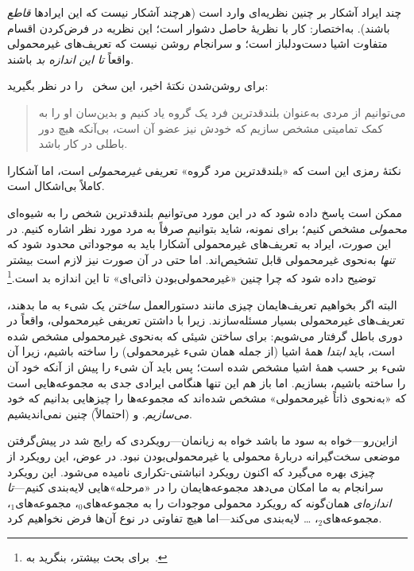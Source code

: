 \documentclass[../../../include/open-logic-section]{subfiles}
\begin{document}
چند ایراد آشکار بر چنین نظریه‌ای وارد است (هرچند آشکار نیست که این ایرادها
\emph{قاطع} باشند). به‌اختصار: کار با نظریهٔ حاصل دشوار است؛ این نظریه در
فرض‌کردن اقسام متفاوت اشیا دست‌ودلباز است؛ و سرانجام روشن نیست که
تعریف‌های غیرمحمولی واقعاً \emph{تا این اندازه بد} باشند.
	
برای روشن‌شدن نکتهٔ اخیر، این سخن~\citeauthor{Ramsey1925} را در نظر
بگیرید:
\begin{quote}
	می‌توانیم از مردی به‌عنوان بلندقدترین فرد یک گروه یاد کنیم و بدین‌سان
	او را به کمک تمامیتی مشخص سازیم که خودش نیز عضو آن است، بی‌آنکه هیچ
	دور باطلی در کار باشد. \citep{Ramsey1925}
\end{quote}
نکتهٔ رمزی این است که «بلندقدترین مرد گروه» تعریفی \emph{غیرمحمولی}
است، اما آشکارا کاملاً بی‌اشکال است.

ممکن است پاسخ داده شود که در این مورد می‌توانیم بلندقدترین شخص را به
شیوه‌ای \emph{محمولی} مشخص کنیم؛ برای نمونه، شاید بتوانیم صرفاً به مرد
مورد نظر اشاره کنیم. در این صورت، ایراد به تعریف‌های غیرمحمولی آشکارا
باید به موجوداتی محدود شود که \emph{تنها} به‌نحوی غیرمحمولی قابل تشخیص‌اند.
اما حتی در آن صورت نیز لازم است بیشتر توضیح داده شود که چرا چنین
«غیرمحمولی‌بودن ذاتی‌ای» تا این اندازه بد است.\footnote{برای بحث بیشتر،
بنگرید به~\citet{Linnebo2010}.}

البته اگر بخواهیم تعریف‌هایمان چیزی مانند دستورالعمل \emph{ساختن} یک شیء
به ما بدهند، تعریف‌های غیرمحمولی بسیار مسئله‌سازند. زیرا با داشتن تعریفی
غیرمحمولی، واقعاً در دوری باطل گرفتار می‌شویم: برای ساختن شیئی که به‌نحوی
غیرمحمولی مشخص شده است، باید \emph{ابتدا} همهٔ اشیا (از جمله همان شیء
غیرمحمولی) را ساخته باشیم، زیرا آن شیء بر حسب همهٔ اشیا مشخص شده است؛ پس
باید آن شیء را پیش از آنکه خود آن را ساخته باشیم، بسازیم. اما باز هم این
تنها هنگامی ایرادی جدی به مجموعه‌هایی است که «به‌نحوی ذاتاً غیرمحمولی»
مشخص شده‌اند که مجموعه‌ها را چیزهایی بدانیم که خود \emph{می‌سازیم}. و
(احتمالاً) چنین نمی‌اندیشیم.

ازاین‌رو---خواه به سود ما باشد خواه به زیانمان---رویکردی که رایج شد در
پیش‌گرفتن موضعی سخت‌گیرانه دربارهٔ محمولی یا غیرمحمولی‌بودن نبود. در عوض،
این رویکرد از چیزی بهره می‌گیرد که اکنون رویکرد انباشتی-تکراری نامیده
می‌شود. این رویکرد سرانجام به ما امکان می‌دهد مجموعه‌هایمان را در
«مرحله»هایی لایه‌بندی کنیم---\emph{تا اندازه‌ای} همان‌گونه که رویکرد
محمولی موجودات را به مجموعه‌های$_0$، مجموعه‌های$_1$، مجموعه‌های$_2$،
\ldots{} لایه‌بندی می‌کند---اما هیچ تفاوتی در نوع آن‌ها فرض نخواهیم کرد.
\end{document}
